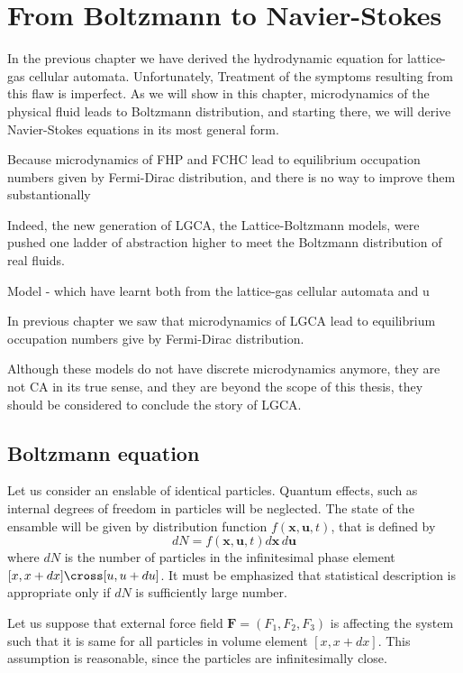 \chapter{From Boltzmann to Navier-Stokes}
In the previous chapter we have derived the hydrodynamic equation for lattice-gas cellular automata. Unfortunately, 
Treatment of the symptoms resulting from this flaw is imperfect.
As we will show in this chapter, microdynamics of the physical fluid leads to Boltzmann distribution, and starting there, we will derive Navier-Stokes equations in its most general form.

Because microdynamics of FHP and FCHC lead to equilibrium occupation numbers given by Fermi-Dirac distribution, and there is no way to improve them substantionally


Indeed, the new generation of LGCA, the Lattice-Boltzmann models, were pushed one ladder of abstraction higher to meet the Boltzmann distribution of real fluids.

Model - which have learnt both from the lattice-gas cellular automata and 
 u

In previous chapter we saw that microdynamics of LGCA lead to equilibrium occupation numbers give by Fermi-Dirac distribution.

Although these models do not have discrete microdynamics anymore, they are not CA in its true sense, and they are beyond the scope of this thesis, they should be considered
to conclude the story of LGCA.

\section{Boltzmann equation}

Let us consider an enslable of identical particles. Quantum effects, such as internal degrees of freedom in particles will be neglected. The state of the ensamble will be given by distribution function $f(\bm{x}, \bm{u}, t)$, that is defined by
\begin{equation} \label{hust}
dN = f(\bm{x}, \bm{u}, t) d\bm{x} \, d\bm{u}
\end{equation} 
where $dN$ is the number of particles in the infinitesimal phase element $[x, x+ dx] \cross [u, u +du]$.
It must be emphasized that statistical description is appropriate only if $dN$ is sufficiently large number.

Let us suppose that external force field $\bm{F} = (F_1, F_2, F_3)$ is affecting the system such that it is same for all particles in volume element $[x, x+ dx]$. This assumption is reasonable, since the particles are infinitesimally close.

